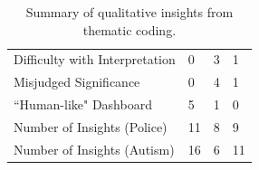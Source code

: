 \begin{table}[ht!]
	\begin{tabular}{l|l|l|l}
	 & \shortsystem & \cluster & \BFS \\ \hline
	Difficulty with Interpretation & 0 & \cellcolor[HTML]{FD6864}3 & 1 \\ \hline
	Misjudged Significance & 0 & \cellcolor[HTML]{FD6864}4 & 1 \\ \hline
	``Human-like" Dashboard & \cellcolor[HTML]{9AFF99}5 & 1 & 0 \\ \hline
	Number of Insights (Police) & \cellcolor[HTML]{9AFF99}11 & 8 & 9 \\ \hline
	Number of Insights (Autism) & \cellcolor[HTML]{9AFF99}16 & 6 & 11
	\end{tabular}
\caption{Summary of qualitative insights from thematic coding.}
\label{table:thematic_summary}
\end{table}
